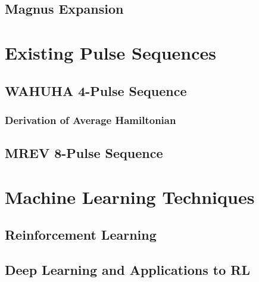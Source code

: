 \subsection{Magnus Expansion}


\section{Existing Pulse Sequences}

\subsection{WAHUHA 4-Pulse Sequence}

\subsubsection{Derivation of Average Hamiltonian}

\subsection{MREV 8-Pulse Sequence}




\section{Machine Learning Techniques}


\subsection{Reinforcement Learning}


\subsection{Deep Learning and Applications to RL}


